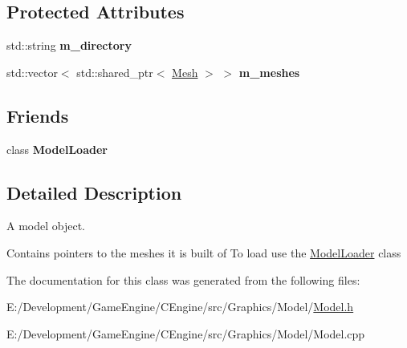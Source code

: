 \subsection*{Protected Attributes}
\begin{DoxyCompactItemize}
\item 
\mbox{\label{classce_1_1graphics_1_1_model_a326b8332797594d1c5bb18ddb0e8d953}} 
std\+::string {\bfseries m\+\_\+directory}
\item 
\mbox{\label{classce_1_1graphics_1_1_model_a03d7857dc5c72c845ff0664ac2abc2ec}} 
std\+::vector$<$ std\+::shared\+\_\+ptr$<$ \hyperlink{classce_1_1graphics_1_1_mesh}{Mesh} $>$ $>$ {\bfseries m\+\_\+meshes}
\end{DoxyCompactItemize}
\subsection*{Friends}
\begin{DoxyCompactItemize}
\item 
\mbox{\label{classce_1_1graphics_1_1_model_ac22dade55c1e8f81ea3e0892cd321190}} 
class {\bfseries Model\+Loader}
\end{DoxyCompactItemize}


\subsection{Detailed Description}
A model object. 

Contains pointers to the meshes it is built of To load use the \hyperlink{classce_1_1graphics_1_1_model_loader}{Model\+Loader} class 

The documentation for this class was generated from the following files\+:\begin{DoxyCompactItemize}
\item 
E\+:/\+Development/\+Game\+Engine/\+C\+Engine/src/\+Graphics/\+Model/\hyperlink{_model_8h}{Model.\+h}\item 
E\+:/\+Development/\+Game\+Engine/\+C\+Engine/src/\+Graphics/\+Model/Model.\+cpp\end{DoxyCompactItemize}
